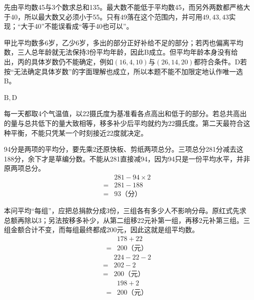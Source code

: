 \documentclass[multi=snippet,border=0pt]{standalone}
\newenvironment{snippet}[3]{\begin{minipage}{#1bp}\color{answerred}\fontsize{#2}{#3}\selectfont\raggedright}{\end{minipage}}
\begin{document}
\begin{snippet}{505}{11.5}{14}先由平均数45与3个数求总和135。最大数不能低于平均数45，而另外两数都严格大于40，所以最大数又必须小于55。只有49落在这个范围内，并可用\(49,43,43\)实现；“大于40”不能误看成“等于40也可以”。\end{snippet}
\begin{snippet}{505}{11.5}{14}甲比平均数多6岁，乙少6岁，多出的部分正好补给不足的部分；若丙也偏离平均数，三人总年龄就无法保持3份平均年龄，因此B成立。但平均年龄本身没有给出，丙的具体岁数仍不能确定，例如\((16,4,10)\)与\((26,14,20)\)都符合条件。D若按“无法确定具体岁数”的字面理解也成立，所以本题不能不加限定地认作唯一选B。\end{snippet}
\begin{snippet}{22}{11.5}{12.8}\(\mathrm{B,D}\)\end{snippet}
\begin{snippet}{505}{11.5}{14}每一天都取4个气温值，以22摄氏度为基准看各点高出和低于的部分。若总共高出的量与总共低下的量大致相等，移多补少后平均就约为22摄氏度。第二天最符合这种平衡，不能只凭某一个时刻接近22度就决定。\end{snippet}
\begin{snippet}{505}{11.5}{14}94分是两项的平均分，要先乘2还原快板、剪纸两项总分。三项总分281分减去这188分，余下才是草编分数。不能从281直接减94，因为94只是一份平均水平，并非原两项总分。\[\begin{aligned}&281-94\times2\\={}&281-188\\={}&93\text{（分）}\end{aligned}\]\end{snippet}
\begin{snippet}{505}{11.5}{14}本问平均“每组”，应把总捐款分成3份，三组各有多少人不影响分母。原红式先求总额再除以3；另法按移多补少，从第二组移22元补第一组，再移2元补第三组。三组金额合计不变，而每组最终都成200元，因此这就是组平均数。\[\begin{aligned}&178+22\\={}&200\text{（元）}\end{aligned}\]\[\begin{aligned}&224-22-2\\={}&202-2\\={}&200\text{（元）}\end{aligned}\]\[\begin{aligned}&198+2\\={}&200\text{（元）}\end{aligned}\]\end{snippet}
\end{document}
